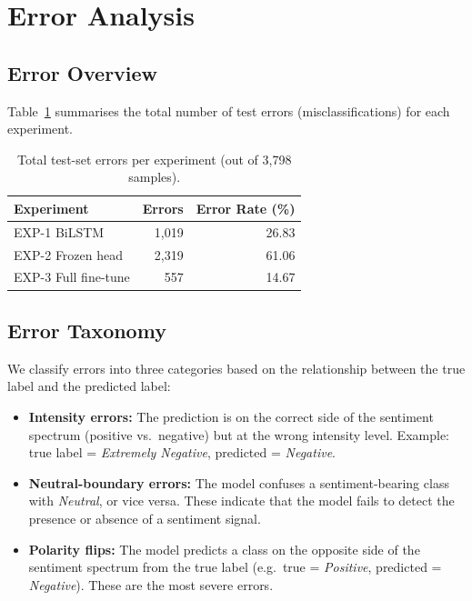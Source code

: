 \section{Error Analysis}

\subsection{Error Overview}

Table~\ref{tab:error_overview} summarises the total number of test errors (misclassifications) for each experiment.

\begin{table}[H]
    \centering
    \caption{Total test-set errors per experiment (out of 3,798 samples).}
    \label{tab:error_overview}
    \begin{tabularx}{\textwidth}{l r r}
        \toprule
        \textbf{Experiment} & \textbf{Errors} & \textbf{Error Rate (\%)} \\
        \midrule
        EXP-1 BiLSTM         & 1,019 & 26.83 \\
        EXP-2 Frozen head    & 2,319 & 61.06 \\
        EXP-3 Full fine-tune & 557   & 14.67 \\
        \bottomrule
    \end{tabularx}
\end{table}

\subsection{Error Taxonomy}

We classify errors into three categories based on the relationship between the true label and the predicted label:

\begin{itemize}
    \item \textbf{Intensity errors:} The prediction is on the correct side of the sentiment spectrum (positive vs.\ negative) but at the wrong intensity level. Example: true label = \textit{Extremely Negative}, predicted = \textit{Negative}.
    \item \textbf{Neutral-boundary errors:} The model confuses a sentiment-bearing class with \textit{Neutral}, or vice versa. These indicate that the model fails to detect the presence or absence of a sentiment signal.
    \item \textbf{Polarity flips:} The model predicts a class on the opposite side of the sentiment spectrum from the true label (e.g.\ true = \textit{Positive}, predicted = \textit{Negative}). These are the most severe errors.
\end{itemize}

